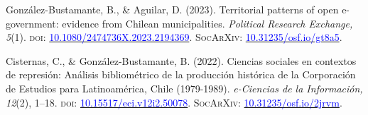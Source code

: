 \begin{publications}

\begin{benumerate}{10}

\item{\small González-Bustamante, B., \& Aguilar, D. (2023). Territorial patterns of open e-government: evidence from Chilean municipalities. {\itshape Political Research Exchange, 5}(1). {\scshape doi:} \href{https://doi.org/10.1080/2474736X.2023.2194369}{\textcolor{blue}{10.1080/2474736X.2023.2194369}}. {\scshape \footnotesize SocArXiv:} \href{https://doi.org/10.31235/osf.io/gt8a5}{\textcolor{blue}{10.31235/osf.io/gt8a5}}.}\vspace{1mm}


\item{\small Cisternas, C., \& González-Bustamante, B. (2022). Ciencias sociales en contextos de represión: Análisis bibliométrico de la producción histórica de la Corporación de Estudios para Latinoamérica, Chile (1979-1989). {\itshape e-Ciencias de la Información, 12}(2), 1--18. {\scshape doi:} \href{https://doi.org/10.15517/eci.v12i2.50078}{\textcolor{blue}{10.15517/eci.v12i2.50078}}. {\scshape \footnotesize SocArXiv:} \href{https://doi.org/10.31235/osf.io/2jrvm}{\textcolor{blue}{10.31235/osf.io/2jrvm}}.}\vspace{1mm} %



\end{benumerate}
\end{publications}
